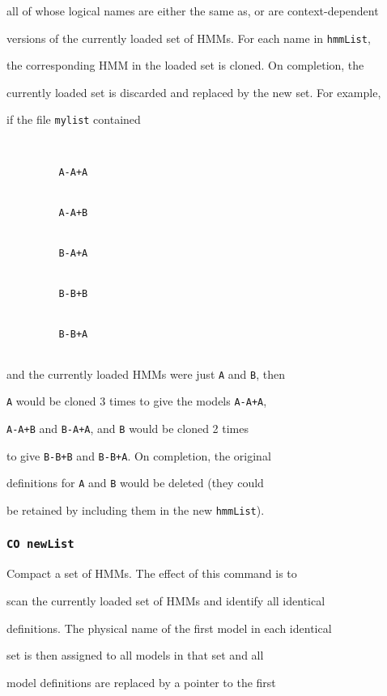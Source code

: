 all of whose logical names are either the same as, or are context-dependent


versions of the currently loaded set of HMMs.  For each name in \texttt{hmmList},


the corresponding HMM in the loaded set is cloned.  On completion, the


currently loaded set is discarded and replaced by the new set.  For example,


if the file \texttt{mylist} contained


\begin{verbatim}


         A-A+A


         A-A+B


         B-A+A


         B-B+B


         B-B+A


\end{verbatim}


and the currently loaded HMMs were just \texttt{A} and \texttt{B}, then


\texttt{A} would be cloned 3 times to give the models \texttt{A-A+A},


\texttt{A-A+B} and \texttt{B-A+A}, and \texttt{B} would be cloned 2 times


to give \texttt{B-B+B} and \texttt{B-B+A}.  On completion, the original


definitions for \texttt{A} and \texttt{B} would be deleted (they could


be retained by including them in the new \texttt{hmmList}).





\subsubsection*{\tt CO newList}





Compact a set of HMMs.  The effect of this command is to


scan the currently loaded set of HMMs and identify all identical


definitions.  The physical name of the first model in each identical


set is then assigned to all models in that set and all


model definitions are replaced by a pointer to the first


